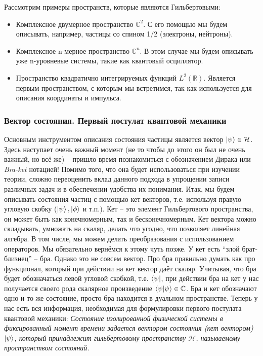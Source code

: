 Рассмотрим примеры пространств, которые являются Гильбертовыми: 
\begin{itemize}
    \item Комплексное двумерное пространство $\mathbb{C}^2$. С его помощью мы будем описывать, например, частицы со спином 1/2 (электроны, нейтроны).
    \item Комплексное n-мерное пространство $\mathbb{C}^n$. В этом случае мы будем описывать уже n-уровневые системы, такие как квантовый осциллятор.
    \item Пространство квадратично интегрируемых функций $L^2(\mathbb{R})$. Является первым пространством, с которым мы встретимся, так как используется для описания координаты и импульса.
\end{itemize}

\subsubsection*{Вектор состояния. Первый постулат квантовой механики}
\hspace{1em} Основным инструментом описания состояния частицы является вектор $\ket{\psi} \in \mathcal{H}$. Здесь наступает очень важный момент (не то чтобы до этого он был не очень важный, но всё же) -- пришло время познакомиться с обозначением Дирака или \textit{Bra-ket} нотацией! Помимо того, что она будет использоваться при изучении теории, сложно переоценить вклад данного подхода в упрощении записи различных задач и в обеспечении удобства их понимания. Итак, мы будем описывать состояния частиц с помощью кет векторов, т.е. используя правую угловую скобку ($\ket{\psi}, \ket{\phi}$ и т.п.). Кет -- это элемент Гильбертового пространства, он может быть как конечномерным, так и бесконечномерным. Кет вектора можно складывать, умножать на скаляр, делать что угодно, что позволяет линейная алгебра. В том числе, мы можем делать преобразования с использованием операторов. Мы обязательно вернёмся к этому чуть позже. У кет есть ``злой брат-близнец'' -- бра. Однако это не совсем вектор. Про бра правильно думать как про функционал, который при действии на кет вектор даёт скаляр. Учитывая, что бра будет обозначаться левой угловой скобкой, т.е. $\bra{\psi}$, при действии бра на кет у нас получается своего рода скалярное произведение $\bra{\psi}\ket{\psi} \in \mathbb{C}$. Бра и кет обозначают одно и то же состояние, просто бра находится в дуальном пространстве. Теперь у нас есть вся информация, необходимая для формулировки первого постулата квантовой механики: \textit{Состояние изолированной физической системы в фиксированный момент времени задается вектором состояния (кет вектором) $\ket{\psi}$, который принадлежит гильбертовому пространству $\mathcal{H}$, называемому пространством состояний.}

